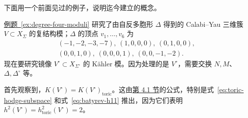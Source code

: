 下面用一个前面见过的例子，说明迄今建立的概念。
\begingroup
{}
\renewcommand{\theHexam}{6.1.4.revisited.\arabic{exam}}
\begin{example}[重访]\label{ex:revisited-toric-kahler}
\hyperref[ex:degree-four-moduli]{例题~\ref*{ex:degree-four-moduli}} 研究了由自反多胞形 $\Delta$ 得到的 Calabi--Yau 三维簇 $V\subset X_\Sigma$ 的复结构模；$\Delta$ 的顶点 $v_1,\ldots,v_6$ 为
\begin{equation}\label{eq:revisited-polytope}
\begin{gathered}
(-1,-2,-3,-7),\ (1,0,0,0),\ (0,1,0,0),\\
(0,0,1,0),\ (0,0,0,1),\ (0,0,-1,-2).
\end{gathered}
\end{equation}
现在要研究镜像 $V^\circ\subset X_{\Sigma^\circ}$ 的 Kähler 模。因为处理的是 $V^\circ$，需要交换 $N,M$、$\Delta,\Delta^\circ$ 等。

首先观察到，$K(V^\circ)=K(V^\circ)_{\mathrm{toric}}$。这由\hyperref[sec:batyrev-mirror]{第 4.1 节}的公式，特别是式~\eqref{eq:toric-hodge-subspace} 和式~\eqref{eq:batyrev-h11} 推出，因为它们表明 $h^2(V^\circ)=h_{\mathrm{toric}}^2(V^\circ)=2$。


\end{example}
